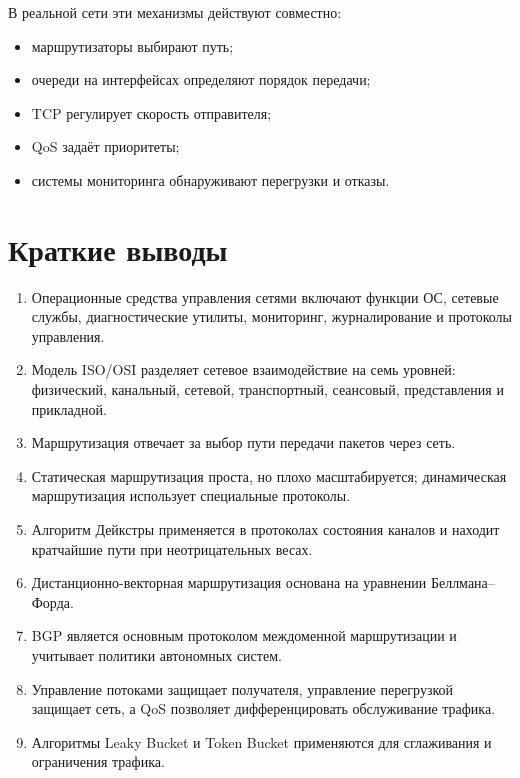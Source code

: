 \documentclass[12pt,a4paper]{article}
\begin{document}
В реальной сети эти механизмы действуют совместно:
\begin{itemize}
    \item маршрутизаторы выбирают путь;
    \item очереди на интерфейсах определяют порядок передачи;
    \item TCP регулирует скорость отправителя;
    \item QoS задаёт приоритеты;
    \item системы мониторинга обнаруживают перегрузки и отказы.
\end{itemize}

\section{Краткие выводы}

\begin{enumerate}
    \item Операционные средства управления сетями включают функции ОС, сетевые службы, диагностические утилиты, мониторинг, журналирование и протоколы управления.
    \item Модель ISO/OSI разделяет сетевое взаимодействие на семь уровней: физический, канальный, сетевой, транспортный, сеансовый, представления и прикладной.
    \item Маршрутизация отвечает за выбор пути передачи пакетов через сеть.
    \item Статическая маршрутизация проста, но плохо масштабируется; динамическая маршрутизация использует специальные протоколы.
    \item Алгоритм Дейкстры применяется в протоколах состояния каналов и находит кратчайшие пути при неотрицательных весах.
    \item Дистанционно-векторная маршрутизация основана на уравнении Беллмана--Форда.
    \item BGP является основным протоколом междоменной маршрутизации и учитывает политики автономных систем.
    \item Управление потоками защищает получателя, управление перегрузкой защищает сеть, а QoS позволяет дифференцировать обслуживание трафика.
    \item Алгоритмы Leaky Bucket и Token Bucket применяются для сглаживания и ограничения трафика.
\end{enumerate}
\end{document}
